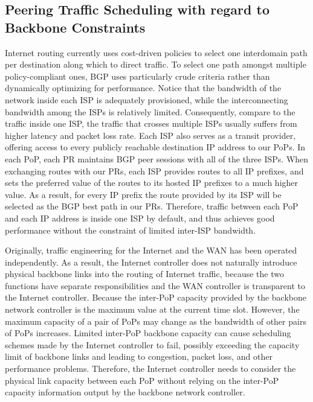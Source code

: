 

\subsection{Peering Traffic Scheduling with regard to Backbone Constraints}
Internet routing currently uses cost-driven policies to select one interdomain path per destination along which to direct traffic. To select one path amongst multiple policy-compliant ones, BGP uses particularly crude criteria rather than dynamically optimizing for performance. Notice that the bandwidth of the network inside each ISP is adequately provisioned, while the interconnecting bandwidth among the ISPs is relatively limited. Consequently, compare to the traffic inside one ISP, the traffic that crosses multiple ISPs usually suffers from higher latency and packet loss rate. Each ISP also serves as a transit provider, offering access to every publicly reachable destination IP address to our PoPs. In each PoP, each PR maintains BGP peer sessions with all of the three ISPs. When exchanging routes with our PRs, each ISP provides routes to all IP prefixes, and sets the preferred value of the routes to its hosted IP prefixes to a much higher value. As a result, for every IP prefix the route provided by its ISP will be selected as the BGP best path in our PRs. Therefore, traffic between each PoP and each IP address is inside one ISP by default, and thus achieves good performance without the constraint of limited inter-ISP bandwidth. 


 Originally, traffic engineering for the Internet and the WAN has been operated independently. As a result, the Internet controller does not naturally introduce physical backbone links into the routing of Internet traffic, because the two functions have separate responsibilities and the WAN controller is transparent to the Internet controller. Because the inter-PoP capacity provided by the backbone network controller is the maximum value at the current time slot. However, the maximum capacity of a pair of PoPs may change as the bandwidth of other pairs of PoPs increases. Limited inter-PoP backbone capacity can cause scheduling schemes made by the Internet controller to fail, possibly exceeding the capacity limit of backbone links and leading to congestion, packet loss, and other performance problems. Therefore, the Internet controller needs to consider the physical link capacity between each PoP without relying on the inter-PoP capacity information output by the backbone network controller.


